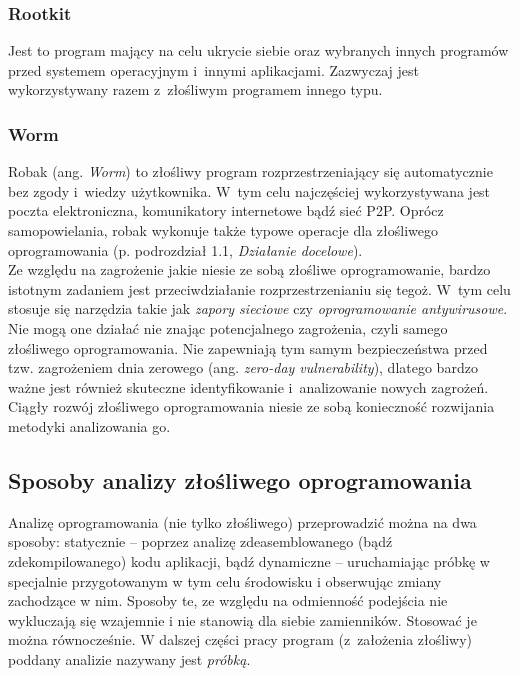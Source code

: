 \documentclass[a4paper,12pt,oneside]{article}
\begin{document}
	\subsubsection{Rootkit}	
	Jest to program mający na celu ukrycie siebie oraz wybranych innych programów przed systemem operacyjnym i~innymi aplikacjami. Zazwyczaj jest wykorzystywany razem z~złośliwym programem innego typu.
				
	\subsubsection{Worm}
	Robak (ang. \textit{Worm}) to złośliwy program rozprzestrzeniający się automatycznie bez zgody i~wiedzy użytkownika. W~tym celu najczęściej wykorzystywana jest poczta elektroniczna, komunikatory internetowe bądź sieć P2P. Oprócz samopowielania, robak wykonuje także typowe operacje dla złośliwego oprogramowania (p. podrozdział 1.1, \textit{Działanie docelowe}). \\				
				
	Ze względu na zagrożenie jakie niesie ze sobą złośliwe oprogramowanie, bardzo istotnym zadaniem jest przeciwdziałanie rozprzestrzenianiu się tegoż. W~tym celu stosuje się narzędzia takie jak \textit{zapory sieciowe} czy \textit{oprogramowanie antywirusowe}. Nie mogą one działać nie znając potencjalnego zagrożenia, czyli samego złośliwego oprogramowania. Nie zapewniają tym samym bezpieczeństwa przed tzw. zagrożeniem dnia zerowego (ang. \textit{zero-day vulnerability}), dlatego bardzo ważne jest również skuteczne identyfikowanie i~analizowanie nowych zagrożeń. Ciągły rozwój złośliwego oprogramowania niesie ze sobą konieczność rozwijania metodyki analizowania go.
			
	\subsection{Sposoby analizy złośliwego oprogramowania}	
	Analizę oprogramowania (nie tylko złośliwego) przeprowadzić można na dwa sposoby: statycznie -- poprzez analizę zdeasemblowanego (bądź zdekompilowanego) kodu aplikacji, bądź dynamiczne -- uruchamiając próbkę w specjalnie przygotowanym w tym celu środowisku i obserwując zmiany zachodzące w nim. Sposoby te, ze względu na odmienność podejścia nie wykluczają się wzajemnie i nie stanowią dla siebie zamienników. Stosować je można równocześnie. W dalszej części pracy program (z~założenia złośliwy) poddany analizie nazywany jest \textit{próbką}.
	
\end{document}
